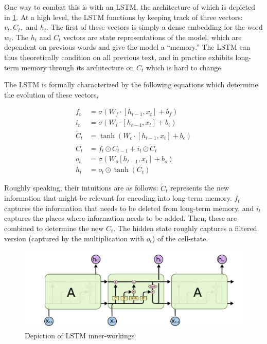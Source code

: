 \documentclass[12pt]{article}
\begin{document}
One way to combat this is with an LSTM, the architecture of which is depicted in
\cref{fig:lstmdiagram}. At a high level, the LSTM functions by keeping track of
three vectors: $v_t, C_t,$ and $h_t$. The first of these vectors is simply a
dense embedding for the word $w_t$. The $h_t$ and $C_t$ vectors are state
representations of the model, which are dependent on previous words and give the
model a ``memory.'' The LSTM can thus theoretically condition on all previous
text, and in practice exhibits long-term memory through its architecture on
$C_t$ which is hard to change.

The LSTM is formally characterized by the following equations which determine
the evolution of these vectors,

\begin{align}
f_t &= \sigma(W_f \cdot [h_{t-1}, x_t] + b_f) \\
i_t &= \sigma(W_i \cdot [h_{t-1}, x_t] + b_i) \\
\tilde C_t &= \tanh(W_c \cdot [h_{t-1}, x_t] + b_c) \\
C_t &= f_t \odot C_{t-1} + i_t \odot \tilde C_t \\
o_t &= \sigma(W_o [h_{t-1}, x_t] + b_o) \\
h_t &= o_t \odot \tanh(C_t)
\end{align}

Roughly speaking, their intuitions are as follows: $\tilde C_t$ represents the
new information that might be relevant for encoding into long-term memory. $f_t$
captures the information that needs to be deleted from long-term memory, and
$i_t$ captures the places where information needs to be added. Then, these are
combined to determine the new $C_t$. The hidden state roughly captures a
filtered version (captured by the multiplication with $o_t$) of the cell-state.

\begin{figure}[htb]
\centering
\includegraphics[width=\textwidth]{figs/lstm-diagram.png}
\caption{Depiction of LSTM inner-workings}
\label{fig:lstmdiagram}
\end{figure}
\end{document}
